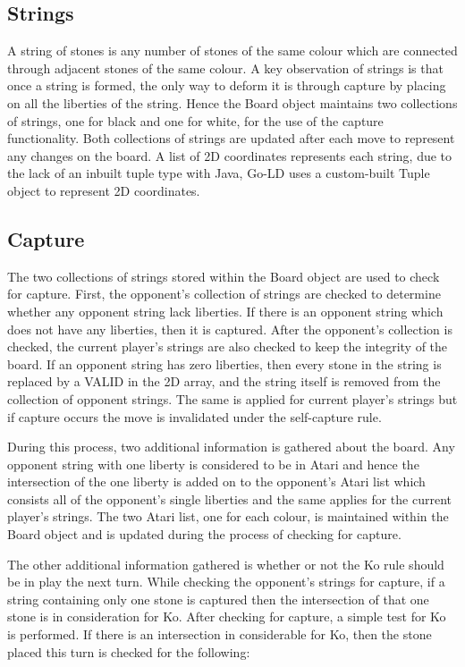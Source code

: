 \documentclass{l4proj}
\begin{document}
\subsection{Strings}
A string of stones is any number of stones of the same colour which are connected through adjacent stones of the same colour. A key observation of strings is that once a string is formed, the only way to deform it is through capture by placing on all the liberties of the string. Hence the Board object maintains two collections of strings, one for black and one for white, for the use of the capture functionality. Both collections of strings are updated after each move to represent any changes on the board. A list of 2D coordinates represents each string, due to the lack of an inbuilt tuple type with Java, Go-LD uses a custom-built Tuple object to represent 2D coordinates.

\subsection{Capture}
The two collections of strings stored within the Board object are used to check for capture. First, the opponent's collection of strings are checked to determine whether any opponent string lack liberties. If there is an opponent string which does not have any liberties, then it is captured. After the opponent's collection is checked, the current player's strings are also checked to keep the integrity of the board. If an opponent string has zero liberties, then every stone in the string is replaced by a VALID in the 2D array, and the string itself is removed from the collection of opponent strings. The same is applied for current player's strings but if capture occurs the move is invalidated under the self-capture rule.

During this process, two additional information is gathered about the board. Any opponent string with one liberty is considered to be in Atari and hence the intersection of the one liberty is added on to the opponent’s Atari list which consists all of the opponent’s single liberties and the same applies for the current player's strings. The two Atari list, one for each colour, is maintained within the Board object and is updated during the process of checking for capture.

The other additional information gathered is whether or not the Ko rule should be in play the next turn. While checking the opponent’s strings for capture, if a string containing only one stone is captured then the intersection of that one stone is in consideration for Ko. After checking for capture, a simple test for Ko is performed. If there is an intersection in considerable for Ko, then the stone placed this turn is checked for the following:
\end{document}
